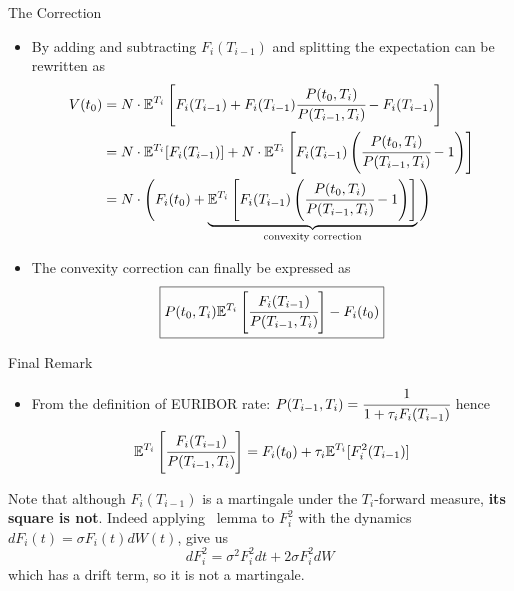 \documentclass{beamer}
\begin{document}
\begin{frame}{The Correction}
	\begin{itemize}
		\item<1-> By adding and subtracting $F_i(T_{i-1})$ and splitting the expectation can be rewritten as
		\begin{equation*}
			\begin{aligned}
				V(t_0) &= N\cdot \mathbb{E}^{T_i}\left[F_i(T_{i-1}) + F_i(T_{i-1})\cfrac{P(t_0,T_i)}{P(T_{i-1}, T_i)} - F_i(T_{i-1})\right] \\
				&= N\cdot \mathbb{E}^{T_i}[F_i(T_{i-1})] + N\cdot \mathbb{E}^{T_i}\left[F_i(T_{i-1})\left(\cfrac{P(t_0,T_i)}{P(T_{i-1}, T_i)}-1\right)\right]\\
				&=N\cdot\Bigg(F_i(t_0) + \underbrace{\mathbb{E}^{T_i}\left[F_i(T_{i-1})\left(\cfrac{P(t_0,T_i)}{P(T_{i-1}, T_i)}-1\right)\right]}_{\text{convexity correction}}\Bigg)
			\end{aligned}
		\end{equation*}
		\item<2-> The convexity correction can finally be expressed as
		\begin{equation}
			\boxed{
				P(t_0,T_i)\mathbb{E}^{T_i}\left[\cfrac{F_i(T_{i-1})}{P(T_{i-1},T_i)}\right]-F_i(t_0)}
		\end{equation}
	\end{itemize}
\end{frame}

\begin{frame}{Final Remark}
	\begin{itemize}
		\item<1-> From the definition of EURIBOR rate: $P(T_{i-1},T_i)=\cfrac{1}{1+\tau_i F_i(T_{i-1})}$ hence
		\begin{equation*}
			\mathbb{E}^{T_i}\left[\cfrac{F_i(T_{i-1})}{P(T_{i-1},T_i)}\right]=F_i(t_0)+\tau_i\mathbb{E}^{T_i}[F_i^2(T_{i-1})]
		\end{equation*}
	\end{itemize}
	\vfill
	\begin{tcolorbox}[colback=gray!5, colframe=maincolor, arc=0mm, boxrule=0.5pt]
		\footnotesize
		Note that although $F_i(T_{i-1})$ is a martingale under the $T_i$-forward measure, \textbf{its square is not}.
		Indeed applying \ito~lemma to $F_i^2$ with the  dynamics $dF_i(t) = \sigma F_i(t)dW(t)$, give us
		\begin{equation*}
			dF_i^2=\sigma^2F_i^2dt+2\sigma F_i^2dW
		\end{equation*}
		which has a drift term, so it is not a martingale.
	\end{tcolorbox}

\end{frame}
\end{document}

